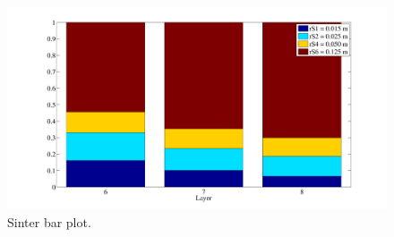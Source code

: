 \begin{figure}[!htb]
\centering
\includegraphics[width=.96\columnwidth]{095SinterBarPlot20150824174530}
\caption[Sinter bar plot]{Sinter bar plot.}
\label{fig:066sinterbarplot}
\end{figure}